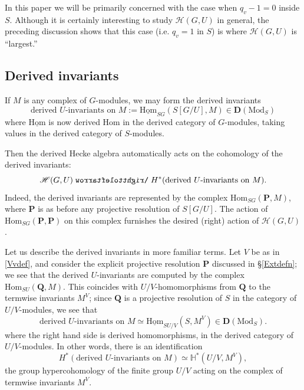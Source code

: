 \documentclass[10pt]{amsart}
\def\acts{\mathrel{\reflectbox{$\righttoleftarrow$}}}
\newcommand{\Hom}{\mathrm{Hom}}
\theoremstyle{remark}
\begin{document}
In this paper we will be primarily concerned with the case when $q_v-1=0$ inside $S$.  Although it is certainly interesting to study $\mathscr{H}(G, U)$ in general,
the preceding discussion shows that this case (i.e. $q_v=1$ in $S$) is where $\mathscr{H}(G, U)$ is ``largest.'' 
 
 
        
     
%
%
%
%
%
%
%
%
%
%
%
%
%
%
%
%
%
%
%
%
%
%
%
%
%
%
%
%
%
%
%
%
%
%
%
%
%
\subsection{Derived invariants} \label{sec:derivedinvariants} 


 If $M$ is any  complex of $G$-modules,  we may form the derived invariants
$$  \mbox{derived $U$-invariants on $M$} := \underline{\mathrm{Hom}}_{SG}(S [G/U], M) \in \mathbf{D}(\mathrm{Mod}_S)$$
where $\underline{\mathrm{Hom}}$ is now  derived $\mathrm{Hom}$ in the derived category of $G$-modules,
taking values in the derived category of $S$-modules. 


Then the derived Hecke algebra automatically acts on the cohomology 
of the derived invariants:
\begin{equation} \label{HGUderived} \mathscr{H}(G, U) \acts  H^*(\mbox{derived $U$-invariants on $M$}).\end{equation}
Indeed, the derived invariants are represented by the complex
$\Hom_{SG}(\mathbf{P}, M)$, where $\mathbf{P}$ is as before any projective resolution of $S[G/U]$. 
The action of $\Hom_{SG}(\mathbf{P}, \mathbf{P})$ on this complex
furnishes the desired (right) action of $\mathscr{H}(G, U)$.


 

Let us describe the derived invariants in more familiar terms.  Let $V$ be as in \eqref{Vvdef}, and  consider the explicit projective resolution $\mathbf{P}$ discussed in \S \ref{Extdefn}; we see 
that the derived $U$-invariants are computed by the complex $\Hom_{SU}(\mathbf{Q}, M)$.
This coincides with $U/V$-homomorphisms from $\mathbf{Q}$ to the termwise invariants $M^{V}$; since $\mathbf{Q}$ is a projective resolution of $S$
in the category of $U/V$-modules, we see that 
 \begin{equation} \label{twosteps}  \mbox{derived $U$-invariants on $M$} \simeq    \underline{\mathrm{Hom}}_{S U/V}(S, M^{V}) \in  \mathbf{D}(\mathrm{Mod}_S).  \end{equation} 
where the right hand side is derived homomorphisms, in the derived category of $U/V$-modules.
 In other words,  there is an identification
 $$ H^*(\mbox{derived $U$-invariants on $M$}) \simeq \mathbb{H}^*(U/V, M^{V}),$$ 
the group hypercohomology  of the finite group $U/V$ acting on the  complex of termwise invariants $M^{V}$.  
\end{document}
